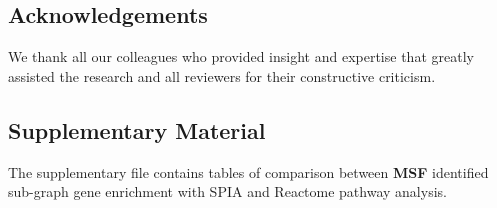 \documentclass[twocolumn]{article}
\begin{document}
\subsection*{Acknowledgements}

We thank all our colleagues who provided insight and expertise that greatly assisted the research and all reviewers for their constructive criticism.  

\subsection*{Supplementary Material}

The supplementary file contains tables of comparison between \textbf{MSF} identified sub-graph gene enrichment with SPIA and Reactome pathway analysis. 
\clearpage
\end{document}
